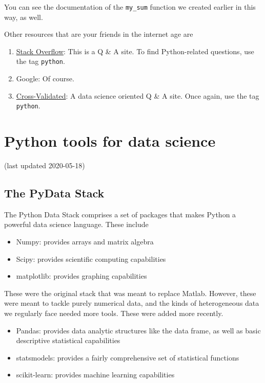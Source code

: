 \documentclass[
  letterpaper,
]{scrbook}
\providecommand{\tightlist}{%
  \setlength{\itemsep}{0pt}\setlength{\parskip}{0pt}}
\begin{document}
You can see the documentation of the \texttt{my\_sum} function we created earlier in this way, as well.

Other resources that are your friends in the internet age are

\begin{enumerate}
\def\labelenumi{\arabic{enumi}.}
\tightlist
\item
  \href{https://stackoverflow.com}{Stack Overflow}: This is a Q \& A site. To find Python-related questions, use the tag \texttt{python}.
\item
  Google: Of course.
\item
  \href{https://stats.stackexchange.com}{Cross-Validated}: A data science oriented Q \& A site. Once again, use the tag \texttt{python}.
\end{enumerate}

\hypertarget{python-tools-for-data-science}{%
\chapter{Python tools for data science}\label{python-tools-for-data-science}}

(last updated 2020-05-18)

\hypertarget{the-pydata-stack}{%
\section{The PyData Stack}\label{the-pydata-stack}}

The Python Data Stack comprises a set of packages that makes Python a powerful data science language. These include

\begin{itemize}
\tightlist
\item
  Numpy: provides arrays and matrix algebra
\item
  Scipy: provides scientific computing capabilities
\item
  matplotlib: provides graphing capabilities
\end{itemize}

These were the original stack that was meant to replace Matlab. However, these were meant to tackle purely numerical data, and the kinds of heterogeneous data we regularly face needed more tools. These were added more recently.

\begin{itemize}
\tightlist
\item
  Pandas: provides data analytic structures like the data frame, as well as basic descriptive statistical capabilities
\item
  statsmodels: provides a fairly comprehensive set of statistical functions
\item
  scikit-learn: provides machine learning capabilities
\end{itemize}
\end{document}
